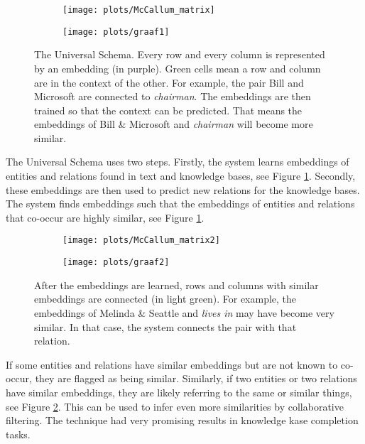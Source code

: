 \documentclass{article}
\begin{document}
 \begin{figure}[H]
 \centering
 \begin{subfigure}{.475\textwidth}
 \texttt{[image: plots/McCallum\_matrix]}
 \end{subfigure}
 \begin{subfigure}{0.475\textwidth}
 \texttt{[image: plots/graaf1]}
 \end{subfigure}
 \caption[Universal Schema]{The Universal Schema. Every row and every column is represented by an embedding (in purple). Green cells mean a row and column are in the context of the other. For example, the pair Bill and Microsoft are connected to \emph{chairman}.
 The embeddings are then trained so that the context can be predicted. That means the embeddings of Bill \& Microsoft and \emph{chairman} will become more similar.}
 \label{McCallum_matrix}
 \end{figure}

The Universal Schema uses two steps. Firstly, the system learns embeddings of entities and relations found in text and knowledge bases\cite{universalschema}, see Figure \ref{McCallum_matrix}. Secondly, these embeddings are then used to predict new relations for the knowledge bases. The system finds embeddings such that the embeddings of entities and relations that co-occur are highly similar, see Figure \ref{McCallum_matrix}.

 \begin{figure}[H]
 \centering
 \begin{subfigure}{0.475\textwidth}
 \texttt{[image: plots/McCallum\_matrix2]}
 \end{subfigure}
 \begin{subfigure}{0.475\textwidth}
 \texttt{[image: plots/graaf2]}
 \end{subfigure}
 \caption[Universal Schema predictions]{After the embeddings are learned, rows and columns with similar embeddings are connected (in light green).
 For example, the embeddings of Melinda \& Seattle and \emph{lives in} may have become very similar. In that case, the system connects the pair with that relation.}
 \label{McCallum_matrix2}
 \end{figure}
 
 If some entities and relations have similar embeddings but are not known to co-occur, they are flagged as being similar. Similarly, if two entities or two relations have similar embeddings, they are likely referring to the same or similar things, see Figure \ref{McCallum_matrix2}. This can be used to infer even more similarities by collaborative filtering. The technique had very promising results in knowledge kase completion tasks.
  
\end{document}
